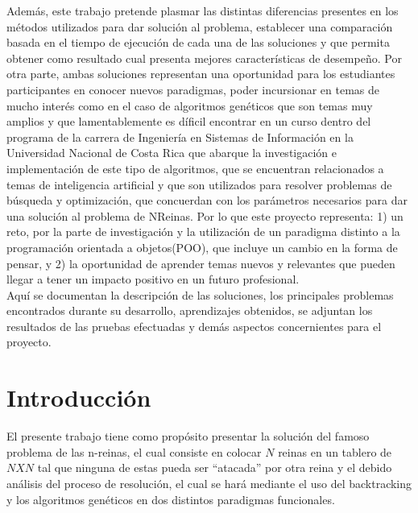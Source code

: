 \documentclass[12pt,a4paper]{article}
\begin{document}
 Además, este trabajo pretende plasmar las distintas diferencias presentes en los métodos utilizados para dar solución al problema, establecer una comparación basada en el tiempo de ejecución de cada una de las soluciones y que permita obtener como resultado cual presenta mejores características de desempeño. Por otra parte, ambas soluciones representan una oportunidad para los estudiantes participantes en conocer nuevos paradigmas, poder incursionar en temas de mucho interés como en el caso de algoritmos genéticos que  son temas muy amplios y que lamentablemente es díficil encontrar en un curso dentro del programa de la carrera de Ingeniería en Sistemas de Información en la Universidad Nacional de Costa Rica que abarque la investigación e implementación de este tipo de algoritmos, que se encuentran relacionados a temas de inteligencia artificial y que son utilizados para resolver problemas de búsqueda y optimización, que concuerdan con los parámetros necesarios para dar una solución al problema de NReinas. Por lo que este proyecto representa: 1) un reto, por la parte de investigación y la utilización de un paradigma distinto a la programación orientada a objetos(POO), que incluye un cambio en la forma de pensar, y 2) la oportunidad de aprender temas nuevos y relevantes que pueden llegar a tener un impacto positivo en un futuro profesional. \\
 	
 	Aquí se documentan la descripción de las soluciones, los principales problemas encontrados durante su desarrollo, aprendizajes obtenidos, se adjuntan los resultados de las pruebas efectuadas y demás aspectos concernientes para el proyecto.
 	
\pagebreak
\section{Introducción}

	El presente trabajo tiene como propósito presentar la solución del famoso problema de las n-reinas, el cual consiste en colocar $N $ reinas en un tablero de $NXN $ tal que ninguna de estas pueda ser “atacada” por otra reina y el debido análisis del proceso de resolución, el cual se hará mediante el uso del backtracking y los algoritmos genéticos en dos distintos paradigmas funcionales.
\end{document}
